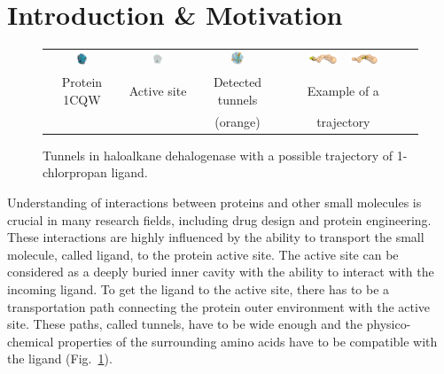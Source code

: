 \documentclass{svmult}
\begin{document}
\section{Introduction \& Motivation}


\begin{figure}[b]
\centering
{\footnotesize
\renewcommand{\arraystretch}{0.1}
\renewcommand{\tabcolsep}{0pt}
\begin{tabular}{ccccc}
\includegraphics[width=0.15\textwidth]{fig/motiv1} &
\includegraphics[width=0.17\textwidth]{fig/motiv2lab} &
\includegraphics[width=0.16\textwidth]{fig/motiv3} &
\hbox{
\vbox{
\hbox{\includegraphics[width=0.25\textwidth]{fig/ta-1} }
\hbox{\includegraphics[width=0.25\textwidth]{fig/ta-433}}
} 
}
\\
Protein 1CQW & Active site & Detected tunnels & Example of a  \\
             &            & (orange)          & trajectory
\end{tabular}
}
\caption{\label{fig::motiv}
    Tunnels in haloalkane dehalogenase with a possible trajectory of 1-chlorpropan ligand.
}
\end{figure}

Understanding of interactions between proteins and other small molecules is crucial in many research fields, including drug design and protein engineering. 
These interactions are highly influenced by the ability to transport the small molecule, called ligand, to the protein active site.
The active site can be considered as a deeply buried inner cavity with the ability to interact with the incoming ligand.
To get the ligand to the active site, there has to be a transportation path connecting the protein outer environment with the active site.
These paths, called tunnels, have to be wide enough and the physico-chemical properties of the surrounding amino acids have to be compatible with the ligand (Fig.~\ref{fig::motiv}).
\end{document}
